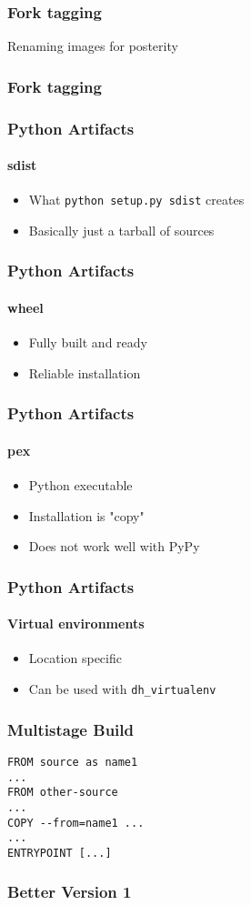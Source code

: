 \documentclass{beamer}
\begin{document}
\begin{frame}
\frametitle{Fork tagging}
Renaming images for posterity
\end{frame}

\begin{frame}[fragile]
\frametitle{Fork tagging}

\end{frame}

\begin{frame}[fragile]
\frametitle{Python Artifacts}
\framesubtitle{sdist}
\begin{itemize}
\item What \verb|python setup.py sdist| creates
\item Basically just a tarball of sources
\end{itemize}
\end{frame}

\begin{frame}[fragile]
\frametitle{Python Artifacts}
\framesubtitle{wheel}
\begin{itemize}
\item Fully built and ready
\item Reliable installation
\end{itemize}
\end{frame}

\begin{frame}[fragile]
\frametitle{Python Artifacts}
\framesubtitle{pex}
\begin{itemize}
\item Python executable
\item Installation is "copy"
\item Does not work well with PyPy
\end{itemize}
\end{frame}

\begin{frame}[fragile]
\frametitle{Python Artifacts}
\framesubtitle{Virtual environments}
\begin{itemize}
\item Location specific
\item Can be used with \verb|dh_virtualenv|
\end{itemize}
\end{frame}

\begin{frame}[fragile]
\frametitle{Multistage Build}
\begin{lstlisting}
FROM source as name1
...
FROM other-source
...
COPY --from=name1 ...
...
ENTRYPOINT [...]
\end{lstlisting}
\end{frame}

\begin{frame}[fragile]
\frametitle{Better Version 1}
\pause
\pause
\pause
\pause

\end{frame}
\end{document}
